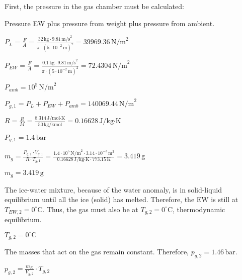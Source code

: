 First, the pressure in the gas chamber must be calculated:  

Pressure EW plus pressure from weight plus pressure from ambient.  

\( P_L = \frac{F}{A} = \frac{32 \, \text{kg} \cdot 9.81 \, \text{m/s}^2}{\pi \cdot (5 \cdot 10^{-2} \, \text{m})^2} = 39969.36 \, \text{N/m}^2 \)  

\( P_{EW} = \frac{F}{A} = \frac{0.1 \, \text{kg} \cdot 9.81 \, \text{m/s}^2}{\pi \cdot (5 \cdot 10^{-2} \, \text{m})^2} = 72.4304 \, \text{N/m}^2 \)  

\( P_{amb} = 10^5 \, \text{N/m}^2 \)  

\( P_{g,1} = P_L + P_{EW} + P_{amb} = 140069.44 \, \text{N/m}^2 \)  

\( R = \frac{R}{M} = \frac{8.314 \, \text{J/mol·K}}{50 \, \text{kg/kmol}} = 0.16628 \, \text{J/kg·K} \)  

\( P_{g,1} = 1.4 \, \text{bar} \)  

\( m_g = \frac{P_{g,1} \cdot V_{g,1}}{R \cdot T_{g,1}} = \frac{1.4 \cdot 10^5 \, \text{N/m}^2 \cdot 3.14 \cdot 10^{-3} \, \text{m}^3}{0.16628 \, \text{J/kg·K} \cdot 773.15 \, \text{K}} = 3.419 \, \text{g} \)  

\( m_g = 3.419 \, \text{g} \)

The ice-water mixture, because of the water anomaly, is in solid-liquid equilibrium until all the ice (solid) has melted. Therefore, the EW is still at \( T_{EW,2} = 0^\circ \text{C} \). Thus, the gas must also be at \( T_{g,2} = 0^\circ \text{C} \), thermodynamic equilibrium.  

\( T_{g,2} = 0^\circ \text{C} \)  

The masses that act on the gas remain constant. Therefore, \( p_{g,2} = 1.46 \, \text{bar} \).  

\( p_{g,2} = \frac{m_K}{V_{g,2}} \cdot T_{g,2} \)